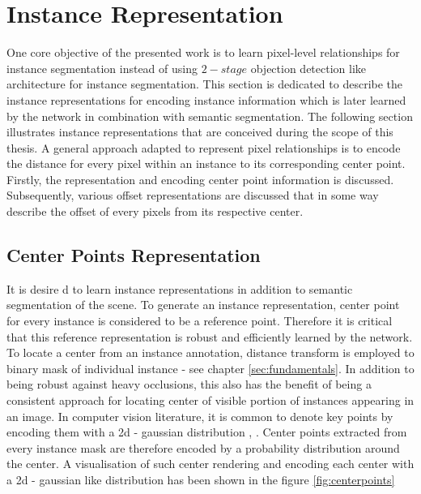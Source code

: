 \section{Instance Representation}

One core objective of the presented work is to learn pixel-level relationships for instance segmentation instead of using $2-stage$ objection detection like architecture for instance segmentation. This section is dedicated to describe the instance representations for encoding instance information which is later learned by the network in combination with semantic segmentation. The following section illustrates instance representations that are conceived during the scope of this thesis. A general approach adapted to represent pixel relationships is to encode the distance for every pixel within an instance to its corresponding center point. Firstly, the representation and encoding center point information is discussed. Subsequently, various offset representations are discussed that in some way describe the offset of every pixels from its respective center. 


\subsection{Center Points Representation}

It is desire
d to learn instance representations in addition to semantic segmentation of the scene. To generate an instance representation, center point for every instance is considered to be a reference point. Therefore it is critical that this reference representation is robust and efficiently learned by the network. To locate a center from an instance annotation, distance transform is employed to binary mask of individual instance  \cite{Borgefors1986} -  see chapter \ref{sec:fundamentals}. In addition to being robust against heavy occlusions, this also has the benefit of being a consistent approach for locating center of visible portion of instances appearing in an image. In computer vision literature, it is common to denote key points by encoding them with a 2d - gaussian distribution \cite{DBLPCPM:journals/corr/WeiRKS16}, \cite{Bulat2016HumanPE}. Center points extracted from every instance mask are therefore encoded by a probability distribution around the center. A visualisation of such center rendering and encoding each center with a 2d - gaussian like distribution has been shown in the figure \ref{fig:centerpoints} 

